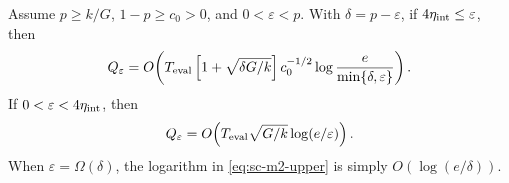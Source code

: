 \begin{theorem}
\label{thm:sc-m2}
Assume $p\ge k/G$, $1-p\ge c_0>0$, and $0<\varepsilon<p$.  With
$\delta=p-\varepsilon$, if $4\eta_{\rm int}\le\varepsilon$, then
\begin{equation}
 Q_\varepsilon=O\!\left(
 T_{\rm eval}\left[1+\sqrt{\delta G/k}\right]c_0^{-1/2}
 \log\frac{e}{\min\{\delta,\varepsilon\}}\right).
 \label{eq:sc-m2-upper}
\end{equation}
If $0<\varepsilon<4\eta_{\rm int}$, then
\begin{equation}
 Q_\varepsilon=O\!\left(
 T_{\rm eval}\sqrt{G/k}\log(e/\varepsilon)\right).
 \label{eq:sc-m2-fallback}
\end{equation}
When $\varepsilon=\Omega(\delta)$, the logarithm
in \eqref{eq:sc-m2-upper} is simply $O(\log(e/\delta))$.
\end{theorem}

